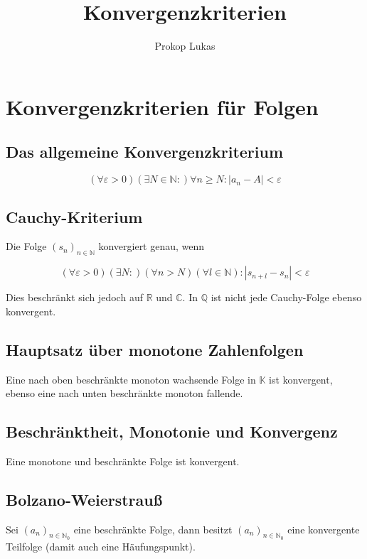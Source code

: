 \documentclass[10pt,twocolumn]{article}
\title{Konvergenzkriterien}
\author{Prokop Lukas}
\renewcommand{\epsilon}{\varepsilon}
\begin{document}
\maketitle

\section{Konvergenzkriterien für Folgen}

\subsection{Das allgemeine Konvergenzkriterium}

\[
    (\forall \epsilon > 0)(\exists N \in \mathbb{N} :)
        \forall n \geq N : | a_n - A | < \epsilon
\]

\subsection{Cauchy-Kriterium}

Die Folge $(s_n)_{n\in\mathbb{N}}$ konvergiert genau, wenn

\[
    (\forall \epsilon > 0)(\exists N : )(\forall n > N)
        (\forall l \in \mathbb{N}) : | s_{n+l} - s_n | < \epsilon
\]

Dies beschränkt sich jedoch auf $\mathbb{R}$ und $\mathbb{C}$. In
$\mathbb{Q}$ ist nicht jede Cauchy-Folge ebenso konvergent.

\subsection{Hauptsatz über monotone Zahlenfolgen}

Eine nach oben beschränkte monoton wachsende Folge
in $\mathbb{K}$ ist konvergent, ebenso eine nach unten
beschränkte monoton fallende.

\subsection{Beschränktheit, Monotonie und Konvergenz}

Eine monotone und beschränkte Folge ist konvergent.

\subsection{Bolzano-Weierstrauß}

Sei $(a_n)_{n\in\mathbb{N}_0}$ eine beschränkte Folge, dann besitzt
$(a_n)_{n\in\mathbb{N}_0}$ eine konvergente Teilfolge (damit auch eine
Häufungspunkt).
\end{document}
